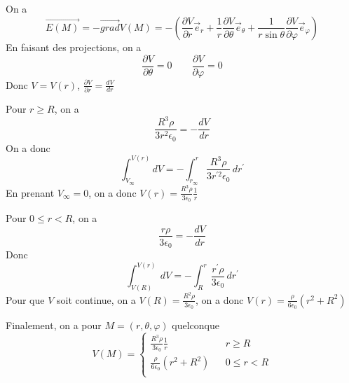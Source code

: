\documentclass[a4paper,12pt]{book}
\begin{document}
\subsection{}
On a 
$$\overrightarrow{E(M)}=-\overrightarrow{grad}V(M)=-\left(\frac{\partial V}{\partial r}\vec{e}_r+\frac{1}{r}\frac{\partial V}{\partial \theta}\vec{e}_\theta+\frac{1}{r\sin\theta}\frac{\partial V}{\partial \varphi}\vec{e}_\varphi\right)$$
En faisant des projections, on a 
$$
\frac{\partial V}{\partial \theta}=0 \qquad \frac{\partial V}{\partial \varphi}=0
$$
Donc $V=V(r)$, $\frac{\partial V}{\partial r}=\frac{dV}{dr}$

Pour $r \geq R$, on a 
$$
\frac{R^3 \rho}{3r^2 \epsilon_0}=-\frac{dV}{dr}
$$
On a donc 
$$
\int_{V_\infty}^{V(r)}dV=-\int_{r_\infty}^{r}\frac{R^3 \rho}{3r^{'2} \epsilon_0}\,dr^{'}
$$
En prenant $V_\infty=0$, on a donc $V(r)=\frac{R^3\rho}{3\epsilon_0}\frac{1}{r}$

Pour $0 \leq r<R$, on a 
$$
\frac{r \rho}{3 \epsilon_0}=-\frac{dV}{dr}
$$
Donc
$$
\int_{V(R)}^{V(r)}dV=-\int_R^{r}\frac{r^{'}\rho}{3\epsilon_0}\,dr^{'}
$$
Pour que $V$ soit continue, on a $V(R)=\frac{R^2\rho}{3\epsilon_0}$, 
on a donc $V(r)=\frac{\rho}{6\epsilon_0}(r^2+ R^2)$

Finalement, on a pour $M=(r,\theta,\varphi)$ quelconque
\begin{equation}  \nonumber
   \boxed{ V(M)=\left\{  
                 \begin{array}{rcl}  
                    \frac{R^3 \rho}{3\epsilon_0}\frac{1}{r} & & r \geq R\\
                    \frac{\rho}{6\epsilon_0}(r^2+ R^2) & & 0\leq r<R\\
                 \end{array}  
    \right.  }
\end{equation}
\end{document}
